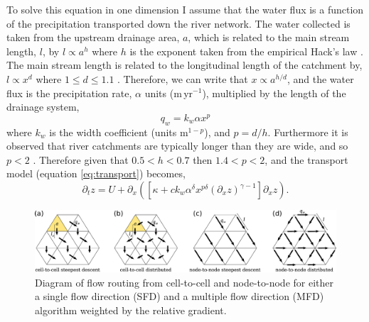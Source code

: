To solve this equation in one dimension I assume that the water flux is a function of the precipitation transported down the river network. The water collected is taken from the upstream drainage area, $a$, which is related to the main stream length, $l$, by $l \propto a^{h}$ where $h$ is the exponent taken from the empirical Hack's law \citep{hack-1957}. The main stream length is related to the longitudinal length of the catchment by, $l \propto x^{d}$ where $1 \leq d \leq 1.1$ \citep{tarboton-etal-1990,maritan-etal-1996}. Therefore, we can write that $x \propto a^{h/d}$, and the water flux is the precipitation rate, $\alpha$ units (m\,yr$^{-1}$), multiplied by the length of the drainage system,
\begin{equation}
q_{w} = k_{w}\alpha x^{p}
\label{eq:waterflux}
\end{equation}
where $k_{w}$ is the width coefficient (units m$^{1-p}$), and $p = d/h$. Furthermore it is observed that river catchments are typically longer than they are wide, and so $p<2$ \citep{dodds-2000a}. Therefore given that $0.5 < h < 0.7$ \citep[e.g.][]{rigon-etal-1996} then $1.4 < p < 2$, and the transport model (equation \ref{eq:transport}) becomes,
\begin{equation}
\partial_{t}z = U + \partial_{x}\left(\left[\kappa +ck_{w}\alpha^{\delta}x^{p\delta}\left(\partial_{x}z\right)^{\gamma-1}\right]\partial_{x}z\right).
\label{eq:1dtransport}
\end{equation}

\begin{figure}
\centering
\includegraphics[width=\textwidth]{./figures/ch2-routing.pdf}
\caption{Diagram of flow routing from cell-to-cell and node-to-node for either a single flow direction (SFD) and a multiple flow direction (MFD) algorithm weighted by the relative gradient.}
\label{fg:routing}
\end{figure}

